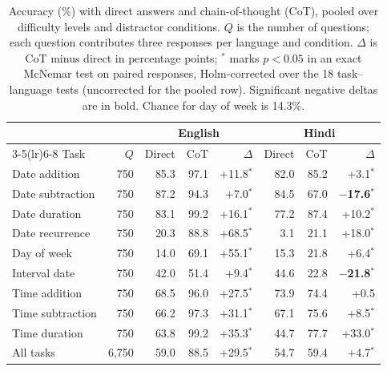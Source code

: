 \begin{table}[t]
\centering
\begin{tabular}{lrrrrrrr}
\toprule
 & & \multicolumn{3}{c}{English} & \multicolumn{3}{c}{Hindi} \\
\cmidrule(lr){3-5}\cmidrule(lr){6-8}
Task & $Q$ & Direct & CoT & $\Delta$ & Direct & CoT & $\Delta$ \\
\midrule
Date addition & 750 & 85.3 & 97.1 & +11.8$^{*}$ & 82.0 & 85.2 & +3.1$^{*}$ \\
Date subtraction & 750 & 87.2 & 94.3 & +7.0$^{*}$ & 84.5 & 67.0 & \textbf{$-$17.6$^{*}$} \\
Date duration & 750 & 83.1 & 99.2 & +16.1$^{*}$ & 77.2 & 87.4 & +10.2$^{*}$ \\
Date recurrence & 750 & 20.3 & 88.8 & +68.5$^{*}$ & 3.1 & 21.1 & +18.0$^{*}$ \\
Day of week & 750 & 14.0 & 69.1 & +55.1$^{*}$ & 15.3 & 21.8 & +6.4$^{*}$ \\
Interval date & 750 & 42.0 & 51.4 & +9.4$^{*}$ & 44.6 & 22.8 & \textbf{$-$21.8$^{*}$} \\
Time addition & 750 & 68.5 & 96.0 & +27.5$^{*}$ & 73.9 & 74.4 & +0.5\phantom{$^{*}$} \\
Time subtraction & 750 & 66.2 & 97.3 & +31.1$^{*}$ & 67.1 & 75.6 & +8.5$^{*}$ \\
Time duration & 750 & 63.8 & 99.2 & +35.3$^{*}$ & 44.7 & 77.7 & +33.0$^{*}$ \\
\midrule
All tasks & 6,750 & 59.0 & 88.5 & +29.5$^{*}$ & 54.7 & 59.4 & +4.7$^{*}$ \\
\bottomrule
\end{tabular}
\caption{Accuracy (\%) with direct answers and chain-of-thought (CoT), pooled over difficulty levels and distractor conditions. $Q$ is the number of questions; each question contributes three responses per language and condition. $\Delta$ is CoT minus direct in percentage points; $^{*}$ marks $p<0.05$ in an exact McNemar test on paired responses, Holm-corrected over the 18 task--language tests (uncorrected for the pooled row). Significant negative deltas are in bold. Chance for day of week is 14.3\%.}
\label{tab:cot-delta}
\end{table}
